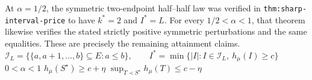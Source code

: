 At \(\alpha=1/2\), the symmetric two-endpoint half--half law was verified in \texttt{thm:sharp-interval-price} to have \(k^*=2\) and \(I^*=L\).  For every \(1/2<\alpha<1\), that theorem likewise verifies the stated strictly positive symmetric perturbations and the same equalities.  These are precisely the remaining attainment claims.
\(\mathcal I_L=\{\{a,a+1,\ldots,b\}\subseteq E:a\leq b\},\qquad I^*=\min\{|I|:I\in\mathcal I_L,\ h_{\mu}(I)\geq c\}\)
\(0<\alpha<1\)
\(h_{\mu}(S^\star)\geq c+\eta\)
\(\sup_{T\prec S^\star}h_{\mu}(T)\leq c-\eta\)
